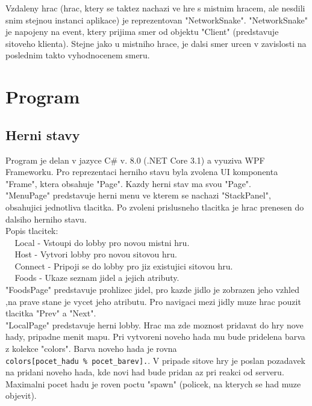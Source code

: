 \documentclass{article}
\newcommand{\s}{$~~~~~$}
\begin{document}
Vzdaleny hrac (hrac, ktery se taktez nachazi ve hre s mistnim hracem, ale nesdili snim stejnou instanci aplikace) je reprezentovan "NetworkSnake". "NetworkSnake" je napojeny na event, ktery prijima smer od objektu "Client" (predstavuje sitoveho klienta). Stejne jako u mistniho hrace, je dalsi smer urcen v zavislosti na poslednim takto vyhodnocenem smeru.

\section*{Program}
\subsection*{Herni stavy}
Program je delan v jazyce C\# v. 8.0 (.NET Core 3.1) a vyuziva WPF Frameworku. Pro reprezentaci herniho stavu byla zvolena UI komponenta "Frame", ktera obsahuje "Page". Kazdy herni stav ma svou "Page".\\

"MenuPage" predstavuje herni menu ve kterem se nachazi "StackPanel", obsahujici jednotliva tlacitka. Po zvoleni prislusneho tlacitka je hrac prenesen do dalsiho herniho stavu. \\

\noindent Popis tlacitek:\\
\s Local - Vstoupi do lobby pro novou mistni hru.\\
\s Host - Vytvori lobby pro novou sitovou hru.\\
\s Connect - Pripoji se do lobby pro jiz existujici sitovou hru.\\
\s Foods - Ukaze seznam jidel a jejich atributy.\\

"FoodsPage" predstavuje prohlizec jidel, pro kazde jidlo je zobrazen jeho vzhled ,na prave stane je vycet jeho atributu. Pro navigaci mezi jidly muze hrac pouzit tlacitka "Prev" a "Next".\\

"LocalPage" predstavuje herni lobby. Hrac ma zde moznost pridavat do hry nove hady, pripadne menit mapu. Pri vytvoreni noveho hada mu bude pridelena barva z kolekce "colors". Barva noveho hada je rovna\\ \lstinline|colors[pocet_hadu % pocet_barev].|. V pripade sitove hry je poslan pozadavek na pridani noveho hada, kde novi had bude pridan az pri reakci od serveru. Maximalni pocet hadu je roven poctu "spawn" (policek, na kterych se had muze objevit). \\
\end{document}
